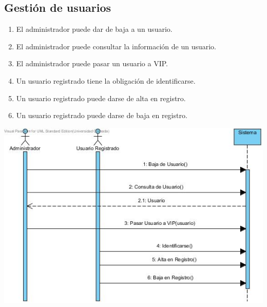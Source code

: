 \documentclass{article}
\begin{document}
	\subsection*{Gestión de usuarios}
		\begin{enumerate}
			\item El administrador puede dar de baja a un usuario.
    			\item El administrador puede consultar la información de un usuario.
    			\item El administrador puede pasar un usuario a VIP.
    			\item Un usuario registrado tiene la obligación de identificarse.
    			\item Un usuario registrado puede darse de alta en registro.
    			\item Un usuario registrado puede darse de baja en registro.
		\end{enumerate}
		\includegraphics[width=1\linewidth]{./S-Usuarios}
\end{document}
